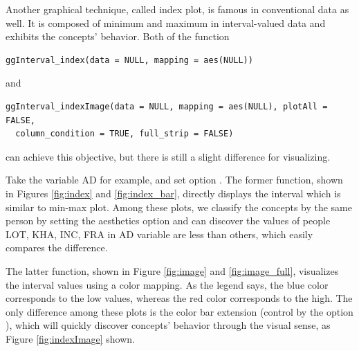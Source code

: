 \documentclass[article]{jss}
\begin{document}
Another graphical technique, called index plot, is famous in conventional data as well. It is composed of minimum and maximum in interval-valued data and exhibits the concepts' behavior. Both of the function

\begin{verbatim}
ggInterval_index(data = NULL, mapping = aes(NULL))
\end{verbatim}

and 

\begin{verbatim}
ggInterval_indexImage(data = NULL, mapping = aes(NULL), plotAll = FALSE,
  column_condition = TRUE, full_strip = FALSE)
\end{verbatim}

can achieve this objective, but there is still a slight difference for visualizing. 

Take the variable AD for example, and set option . The former function, shown in Figures \ref{fig:index} and \ref{fig:index_bar}, directly displays the interval which is similar to min-max plot. Among these plots, we classify the concepts by the same person by setting the aesthetics option  and can discover the values of people LOT, KHA, INC, FRA in AD variable are less than others, which easily compares the difference. 

The latter function, shown in Figure \ref{fig:image} and \ref{fig:image_full}, visualizes the interval values using a color mapping. As the legend says, the blue color corresponds to the low values, whereas the red color corresponds to the high. The only difference among these plots is the color bar extension (control by the option ), which will quickly discover concepts' behavior through the visual sense, as Figure \ref{fig:indexImage} shown.
\end{document}
